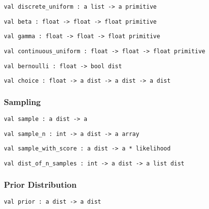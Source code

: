 \protect\hyperlink{val-discreteux5funiform}{}\texttt{val\ discrete\_uniform\ :\ \textquotesingle{}a\ list\ -\textgreater{}\ \textquotesingle{}a\ primitive}

\protect\hyperlink{val-beta}{}\texttt{val\ beta\ :\ float\ -\textgreater{}\ float\ -\textgreater{}\ float\ primitive}

\protect\hyperlink{val-gamma}{}\texttt{val\ gamma\ :\ float\ -\textgreater{}\ float\ -\textgreater{}\ float\ primitive}

\protect\hyperlink{val-continuousux5funiform}{}\texttt{val\ continuous\_uniform\ :\ float\ -\textgreater{}\ float\ -\textgreater{}\ float\ primitive}

\protect\hyperlink{val-bernoulli}{}\texttt{val\ bernoulli\ :\ float\ -\textgreater{}\ bool\ dist}

\protect\hyperlink{val-choice}{}\texttt{val\ choice\ :\ float\ -\textgreater{}\ \textquotesingle{}a\ dist\ -\textgreater{}\ \textquotesingle{}a\ dist\ -\textgreater{}\ \textquotesingle{}a\ dist}

\hypertarget{distux5fsample}{\subsubsection{\texorpdfstring{\protect\hyperlink{distux5fsample}{}Sampling}{Sampling}}\label{distux5fsample}}

\protect\hyperlink{val-sample}{}\texttt{val\ sample\ :\ \textquotesingle{}a\ dist\ -\textgreater{}\ \textquotesingle{}a}

\protect\hyperlink{val-sampleux5fn}{}\texttt{val\ sample\_n\ :\ int\ -\textgreater{}\ \textquotesingle{}a\ dist\ -\textgreater{}\ \textquotesingle{}a\ array}

\protect\hyperlink{val-sampleux5fwithux5fscore}{}\texttt{val\ sample\_with\_score\ :\ \textquotesingle{}a\ dist\ -\textgreater{}\ \textquotesingle{}a\ *\ likelihood}

\protect\hyperlink{val-distux5fofux5fnux5fsamples}{}\texttt{val\ dist\_of\_n\_samples\ :\ int\ -\textgreater{}\ \textquotesingle{}a\ dist\ -\textgreater{}\ \textquotesingle{}a\ list\ dist}

\hypertarget{prior}{\subsubsection{\texorpdfstring{\protect\hyperlink{prior}{}Prior
Distribution}{Prior Distribution}}\label{prior}}

\protect\hyperlink{val-priorux27}{}\texttt{val\ prior\textquotesingle{}\ :\ \textquotesingle{}a\ dist\ -\textgreater{}\ \textquotesingle{}a\ dist}


